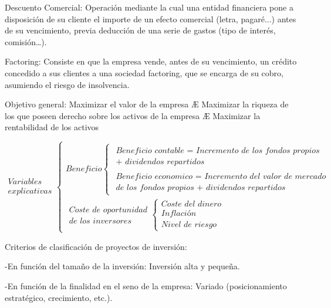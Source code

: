 \documentclass[12pt, twoside, openright]{report} %
\begin{document}
Descuento Comercial: Operación mediante la cual una entidad financiera pone a disposición de su cliente el
importe de un efecto comercial (letra, pagaré...) antes de su vencimiento, previa deducción de una serie de
gastos (tipo de interés, comisión…).

Factoring: Consiste en que la empresa vende, antes de su vencimiento, un crédito concedido a sus clientes a
una sociedad factoring, que se encarga de su cobro, asumiendo el riesgo de insolvencia.

Objetivo general: Maximizar el valor de la empresa Æ Maximizar la riqueza de los que poseen derecho sobre
los activos de la empresa Æ Maximizar la rentabilidad de los activos

$$\begin{gathered}\textit{Variables } \\ \textit{explicativas}\end{gathered}
\begin{cases}
\textit{Beneficio} \begin{cases}
\begin{gathered}\textit{Beneficio contable = Incremento de los fondos propios} \\  \textit{+ dividendos repartidos}\end{gathered} \\
\begin{gathered}\textit{Beneficio economico = Incremento del valor de mercado} \\  \textit{de los fondos propios + dividendos repartidos} \end{gathered}
\end{cases} \\
\begin{gathered}\textit{Coste de oportunidad}\\ \textit{de los inversores}\end{gathered} \begin{cases}
\textit{Coste del dinero} \\
\textit{Inflación} \\
\textit{Nivel de riesgo}
\end{cases} 
\end{cases}$$

Criterios de clasificación de proyectos de inversión:

-En función del tamaño de la inversión: Inversión alta y pequeña.

-En función de la finalidad en el seno de la empresa: Variado (posicionamiento estratégico, crecimiento, etc.).
\end{document}
